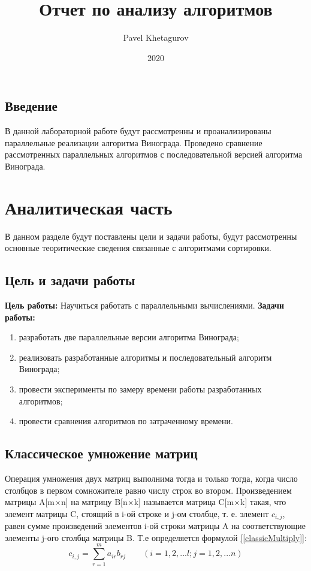 \documentclass{article}
\title{Отчет по анализу алгоритмов}
\date{2020}
\author{Pavel Khetagurov}
\begin{document}
	
	\newpage
	\tableofcontents
	\newpage
	\begin{center}
	    \section*{Введение}
	\end{center}
		\indent В данной лабораторной работе будут рассмотренны и проанализированы параллельные реализации алгоритма Винограда. Проведено сравнение рассмотренных параллельных алгоритмов с последовательной версией алгоритма Винограда.
	\newpage
	\section{Аналитическая часть}
	В данном разделе будут поставлены цели и задачи работы, будут рассмотренны основные теоритические сведения связанные с алгоритмами сортировки.
		\subsection{Цель и задачи работы}
			\textbf{Цель работы:}
			\newline
			Научиться работать с параллельными вычислениями.
			\newline 
			\indent \textbf{Задачи работы:}
			\begin{enumerate}
				\item разработать две параллельные версии алгоритма Винограда;
				\item реализовать разработанные алгоритмы и последовательный алгоритм Винограда;
				\item провести эксперименты по замеру времени работы разработанных алгоритмов;
				\item провести сравнения алгоритмов по затраченному времени.
			\end{enumerate}

		\subsection{Классическое умножение матриц}
		Операция умножения двух матриц выполнима тогда и только тогда, когда число
столбцов в первом сомножителе равно числу строк во втором.
\newline
\indent				Произведением матрицы A[m×n] на матрицу B[n×k] называется матрица C[m×k] такая,
			что элемент матрицы C, стоящий в i-ой строке и j-ом столбце, т. е. элемент $c_{i,j}$, равен сумме
			произведений элементов i-ой строки матрицы A на соответствующие элементы j-ого столбца
матрицы B. Т.е определяется формулой \hyperref[classicMultiply]{[\ref{classicMultiply}]}:
			\begin{equation}\label{classicMultiply}
			c_{i,j} = \sum_{r=1}^{m}a_{ir}b_{rj} \qquad (i=1,2,...l; j = 1,2,...n)
			 \end{equation}
\end{document}
